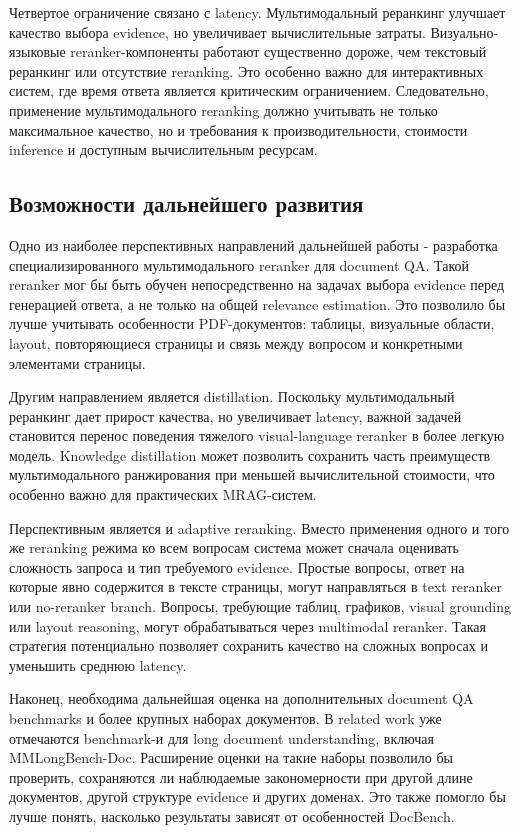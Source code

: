 \documentclass[conference]{IEEEtran}
\begin{document}
Четвертое ограничение связано с latency. Мультимодальный реранкинг улучшает качество выбора evidence, но увеличивает вычислительные затраты. Визуально-языковые reranker-компоненты работают существенно дороже, чем текстовый реранкинг или отсутствие reranking. Это особенно важно для интерактивных систем, где время ответа является критическим ограничением. Следовательно, применение мультимодального reranking должно учитывать не только максимальное качество, но и требования к производительности, стоимости inference и доступным вычислительным ресурсам.

\subsection{Возможности дальнейшего развития}

Одно из наиболее перспективных направлений дальнейшей работы - разработка специализированного мультимодального reranker для document QA. Такой reranker мог бы быть обучен непосредственно на задачах выбора evidence перед генерацией ответа, а не только на общей relevance estimation. Это позволило бы лучше учитывать особенности PDF-документов: таблицы, визуальные области, layout, повторяющиеся страницы и связь между вопросом и конкретными элементами страницы.

Другим направлением является distillation. Поскольку мультимодальный реранкинг дает прирост качества, но увеличивает latency, важной задачей становится перенос поведения тяжелого visual-language reranker в более легкую модель. Knowledge distillation может позволить сохранить часть преимуществ мультимодального ранжирования при меньшей вычислительной стоимости, что особенно важно для практических MRAG-систем.

Перспективным является и adaptive reranking. Вместо применения одного и того же reranking режима ко всем вопросам система может сначала оценивать сложность запроса и тип требуемого evidence. Простые вопросы, ответ на которые явно содержится в тексте страницы, могут направляться в text reranker или no-reranker branch. Вопросы, требующие таблиц, графиков, visual grounding или layout reasoning, могут обрабатываться через multimodal reranker. Такая стратегия потенциально позволяет сохранить качество на сложных вопросах и уменьшить среднюю latency.

Наконец, необходима дальнейшая оценка на дополнительных document QA benchmarks и более крупных наборах документов. В related work уже отмечаются benchmark-и для long document understanding, включая MMLongBench-Doc. Расширение оценки на такие наборы позволило бы проверить, сохраняются ли наблюдаемые закономерности при другой длине документов, другой структуре evidence и других доменах. Это также помогло бы лучше понять, насколько результаты зависят от особенностей DocBench.
\end{document}

